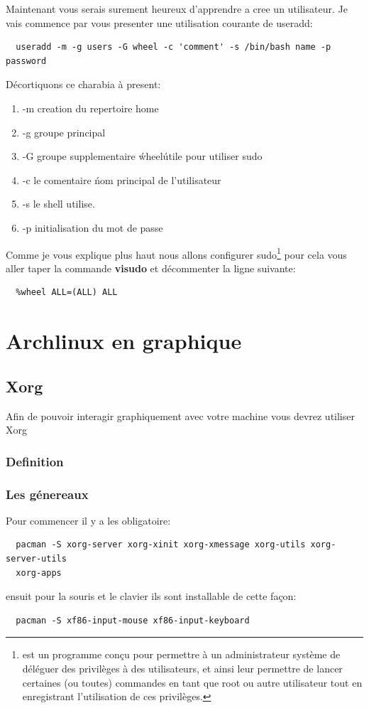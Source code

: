 \documentclass[a4paper]{book}
\begin{document}
Maintenant vous serais surement heureux d'apprendre a cree un utilisateur.
Je vais commence par vous presenter une utilisation courante de useradd\@:
\begin{verbatim}
  useradd -m -g users -G wheel -c 'comment' -s /bin/bash name -p password
\end{verbatim}
Décortiquons ce charabia à present\@:
\begin{enumerate}
  \item -m creation du repertoire home
  \item -g groupe principal
  \item -G groupe supplementaire \'wheel\' utile pour utiliser sudo
  \item -c le comentaire \' nom principal de l'utilisateur
  \item -s le shell utilise.
  \item -p initialisation du mot de passe
\end{enumerate}
Comme je vous explique plus haut nous allons configurer sudo\footnote{est un
programme conçu pour permettre à un administrateur système de déléguer des
privilèges à des utilisateurs, et ainsi leur permettre de lancer certaines
(ou toutes) commandes en tant que root ou autre utilisateur tout en
enregistrant l'utilisation de ces privilèges.}
pour cela vous aller taper la commande \textbf{visudo}
et décommenter la ligne suivante\@:
\begin{verbatim}
  %wheel ALL=(ALL) ALL
\end{verbatim}
\part{Archlinux en graphique}
\chapter{Xorg}
Afin de pouvoir interagir graphiquement avec votre machine vous devrez
utiliser Xorg
\section{Definition}
\section{Les g\'enereaux}
Pour commencer il y a les obligatoire\@:
\begin{verbatim}
  pacman -S xorg-server xorg-xinit xorg-xmessage xorg-utils xorg-server-utils
  xorg-apps
\end{verbatim}
ensuit pour la souris et le clavier ils sont installable de cette façon\@:
\begin{verbatim}
  pacman -S xf86-input-mouse xf86-input-keyboard
\end{verbatim}
\end{document}
